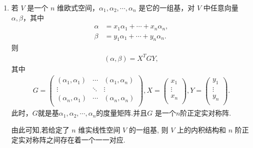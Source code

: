 \documentclass[../../main.tex]{subfiles}
\begin{document}
\begin{theorem}\label{theorem:度量矩阵的性质}
\begin{enumerate}
\item 若 \(V\) 是一个 \(n\) 维欧式空间，\(\alpha_1,\alpha_2,\cdots,\alpha_n\) 是它的一组基，对 \(V\) 中任意向量 \(\alpha,\beta\)，其中
\begin{align*}
\alpha&=x_1\alpha_1+\cdots + x_n\alpha_n,\\
\beta&=y_1\alpha_1+\cdots + y_n\alpha_n.
\end{align*}
则
\begin{align}
(\alpha,\beta)=X^TGY,\label{equation:---9.2.1}
\end{align}
其中
\begin{align*}
G=\left( \begin{matrix}
\left( \alpha _1,\alpha _1 \right)&		\cdots&		\left( \alpha _1,\alpha _n \right)\\
\vdots&		\ddots&		\vdots\\
\left( \alpha _n,\alpha _1 \right)&		\cdots&		\left( \alpha _n,\alpha _n \right)\\
\end{matrix} \right) ,X=\left( \begin{array}{c}
x_1\\
\vdots\\
x_n\\
\end{array} \right) ,Y=\left( \begin{array}{c}
y_1\\
\vdots\\
y_n\\
\end{array} \right) .
\end{align*}
此时，$G$就是基\(\alpha_1,\alpha_2,\cdots,\alpha_n\)的度量矩阵.并且$G$ 是一个$n$阶正定实对称阵.

由此可知,若给定了 $n$ 维实线性空间 $V$ 的一组基, 则 $V$ 上的内积结构和 $n$ 阶正定实对称阵之间存在着一个一一对应. 


\end{enumerate}
\end{theorem}
\end{document}
